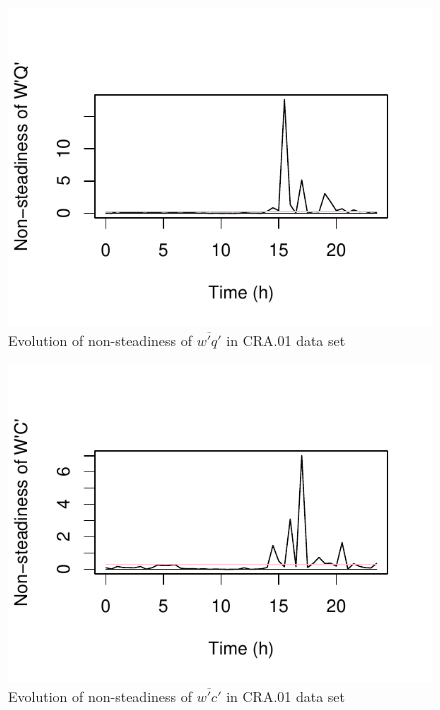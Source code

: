 \documentclass[a4paper,10pt]{book}
\begin{document}
\begin{figure}[htp]
 \centering
 \begin{center}
 \includegraphics[scale=1.1,keepaspectratio=true]{./diagrams/CRA01_WQ_NonSte.pdf}
 \end{center}
 \caption{Evolution of non-steadiness of $\overline{w'q'}$ in CRA.01 data set}
 \label{fig:CRA.01 Nonste WQ}
\end{figure}

\begin{figure}[htp]
 \centering
 \begin{center}
 \includegraphics[scale=1.1,keepaspectratio=true]{./diagrams/CRA01_WC_NonSte.pdf}
 \end{center}
 \caption{Evolution of non-steadiness of $\overline{w'c'}$ in CRA.01 data set}
 \label{fig:CRA.01 Nonste WC}
\end{figure}
\end{document}
